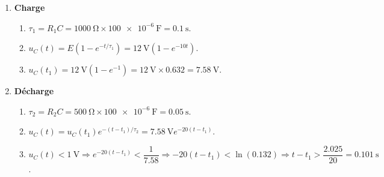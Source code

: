 \begin{enumerate}[label=\arabic*)]
  \item \textbf{Charge}
  \begin{enumerate}[label=\alph*)]
    \item $\tau_1 = R_1 C = \SI{1000}{\ohm} \times \SI{100e-6}{\farad} = \SI{0.1}{\second}$.
    \item $u_C(t) = E(1 - e^{-t/\tau_1}) = \SI{12}{\volt}(1 - e^{-10t})$.
    \item $u_C(t_1) = \SI{12}{\volt}(1 - e^{-1}) = \SI{12}{\volt} \times 0.632 = \SI{7.58}{\volt}$.
  \end{enumerate}
  \item \textbf{Décharge}
  \begin{enumerate}[label=\alph*)]
    \item $\tau_2 = R_2 C = \SI{500}{\ohm} \times \SI{100e-6}{\farad} = \SI{0.05}{\second}$.
    \item $u_C(t) = u_C(t_1) e^{-(t-t_1)/\tau_2} = \SI{7.58}{\volt} e^{-20(t-t_1)}$.
    \item $u_C(t) < \SI{1}{\volt} \Rightarrow e^{-20(t-t_1)} < \dfrac{1}{7.58} \Rightarrow -20(t-t_1) < \ln(0.132) \Rightarrow t-t_1 > \dfrac{2.025}{20} = \SI{0.101}{\second}$.
  \end{enumerate}
\end{enumerate}